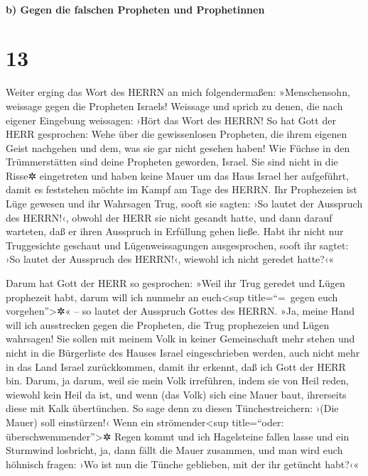 \hypertarget{b-gegen-die-falschen-propheten-und-prophetinnen}{%
\paragraph{b) Gegen die falschen Propheten und
Prophetinnen}\label{b-gegen-die-falschen-propheten-und-prophetinnen}}

\hypertarget{section-12}{%
\section{13}\label{section-12}}

Weiter erging das Wort des HERRN an mich folgendermaßen:
»Menschensohn, weissage gegen die Propheten Israels!
Weissage und sprich zu denen, die nach eigener Eingebung weissagen:
›Hört das Wort des HERRN! So hat Gott der HERR gesprochen:
Wehe über die gewissenlosen Propheten, die ihrem eigenen Geist nachgehen
und dem, was sie gar nicht gesehen haben! Wie Füchse in
den Trümmerstätten sind deine Propheten geworden, Israel.
Sie sind nicht in die Risse✲ eingetreten und haben keine
Mauer um das Haus Israel her aufgeführt, damit es feststehen möchte im
Kampf am Tage des HERRN. Ihr Prophezeien ist Lüge gewesen
und ihr Wahrsagen Trug, sooft sie sagten: ›So lautet der Ausspruch des
HERRN!‹, obwohl der HERR sie nicht gesandt hatte, und dann darauf
warteten, daß er ihren Ausspruch in Erfüllung gehen ließe.
Habt ihr nicht nur Truggesichte geschaut und
Lügenweissagungen ausgesprochen, sooft ihr sagtet: ›So lautet der
Ausspruch des HERRN!‹, wiewohl ich nicht geredet hatte?‹«

Darum hat Gott der HERR so gesprochen: »Weil ihr Trug
geredet und Lügen prophezeit habt, darum will ich nunmehr an
euch\textless sup title=``=~gegen euch vorgehen''\textgreater✲« -- so
lautet der Ausspruch Gottes des HERRN. »Ja, meine Hand
will ich ausstrecken gegen die Propheten, die Trug prophezeien und Lügen
wahrsagen! Sie sollen mit meinem Volk in keiner Gemeinschaft mehr stehen
und nicht in die Bürgerliste des Hauses Israel eingeschrieben werden,
auch nicht mehr in das Land Israel zurückkommen, damit ihr erkennt, daß
ich Gott der HERR bin. Darum, ja darum, weil sie mein
Volk irreführen, indem sie von Heil reden, wiewohl kein Heil da ist, und
wenn (das Volk) sich eine Mauer baut, ihrerseits diese mit Kalk
übertünchen. So sage denn zu diesen Tünchestreichern:
›(Die Mauer) soll einstürzen!‹ Wenn ein strömender\textless sup
title=``oder: überschwemmender''\textgreater✲ Regen kommt und ich
Hagelsteine fallen lasse und ein Sturmwind losbricht, ja,
dann fällt die Mauer zusammen, und man wird euch höhnisch fragen: ›Wo
ist nun die Tünche geblieben, mit der ihr getüncht habt?‹«

